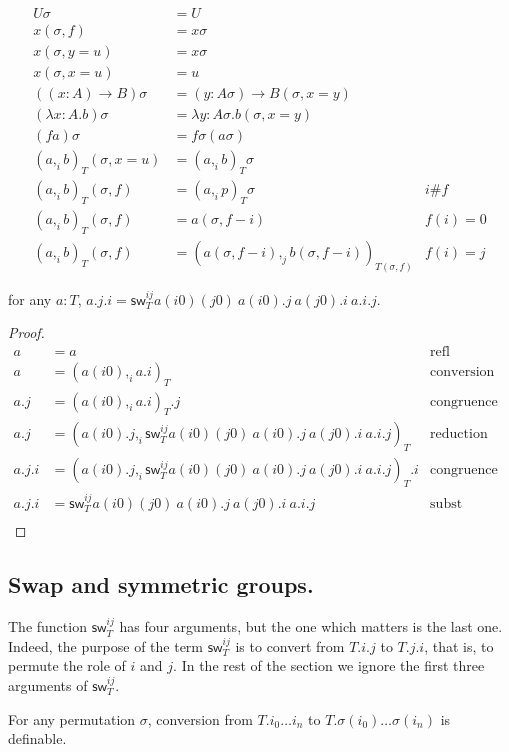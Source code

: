 \documentclass[10pt,a4paper]{article}
\newcommand\CC[4]{(#2,_{#1} #3)_{#4}}
\newcommand\sw[2]{\mathsf{sw}^{#1}_{#2}}
\begin{document}
\begin{align*}
  Uσ &= U \\
  x(σ,f) &= xσ \\
  x(σ,y=u) &= xσ \\
  x(σ,x=u) &= u \\
  ((x:A)→ B)σ &= (y:Aσ) → B(σ,x=y) \\
  (λ x:A. b)σ &= λ y:Aσ. b(σ,x=y) \\
  (f a)σ &= fσ  (aσ) \\
  (a,_i b)_T(σ,x=u)  &= (a,_i b)_Tσ  \\
  (a,_i b)_T(σ,f)  &= (a,_i p)_Tσ & i \# f \\
  (a,_i b)_T(σ,f)  &= a(σ,f-i) & f(i) = 0 \\
  (a,_i b)_T(σ,f)  &= (a(σ,f-i),_j b(σ,f-i))_{T(σ,f)} & f(i) = j
\end{align*}

\begin{lemma}\label{lem:term-swap}
  for any $a:T$, $a.j.i = \sw {ij} T a(i0)(j0)~a(i0).j~a(j0).i~a.i.j$.
\end{lemma}
\begin{proof}
  \begin{align*}
    a &= a & \text{refl} \\
    a &= \CC i {a(i0)} {a.i} T & \text{conversion rule} \\
    a.j & = \CC i {a(i0)} {a.i} T .j & \text{congruence} \\
    a.j & = \CC i {a(i0).j} {\sw{ij} T a(i0)(j0)~a(i0).j~a(j0).i~a.i.j} T & \text{reduction} \\
    a.j.i & = \CC i {a(i0).j} {\sw{ij} T a(i0)(j0)~a(i0).j~a(j0).i~a.i.j} T.i & \text{congruence} \\
    a.j.i & = \sw{ij} T a(i0)(j0)~a(i0).j~a(j0).i~a.i.j & \text{subst} \\
\end{align*}
\end{proof}
\subsection{Swap and symmetric groups.}

The function $\sw {ij} T$ has four arguments, but the one which
matters is the last one.  Indeed, the purpose of the term $\sw {ij} T$
is to convert from $T.i.j$ to $T.j.i$, that is, to permute the role of
$i$ and $j$. In the rest of the section we ignore the first three
arguments of $\sw {ij} T$.

\begin{theorem}
For any permutation $σ$, conversion from $T.i_0 … i_n$ to $T.σ(i_0) …
σ(i_n)$ is definable.

\end{theorem}
\end{document}
